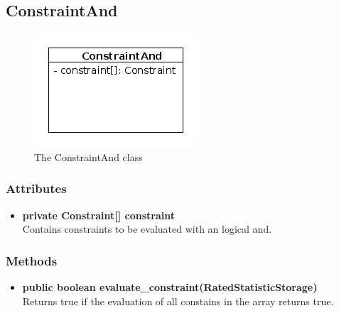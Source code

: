 \newpage
\subsection{ConstraintAnd}
\begin{figure}[htbp]
	\begin{minipage}[t]{8cm}
		\vspace{0pt}
		\centering
		\includegraphics[scale=0.6]{./diagram_pictures/reactor/ConstraintAnd.png}
		\caption{The ConstraintAnd class}
	\end{minipage}
	\hfill
	\begin{minipage}[t]{8cm}
		\vspace{10pt}
			
	\end{minipage}
\end{figure}  

\subsubsection{Attributes}
\begin{itemize}
	\item \textbf{ private Constraint[] constraint }\\
	Contains constraints to be evaluated with an logical and.
\end{itemize}
\subsubsection{Methods}
\begin{itemize}
	\item \textbf{ public boolean evaluate\_constraint(RatedStatisticStorage) }\\
	Returns true if the evaluation of all constains in the array returns true.
\end{itemize}


\newpage
